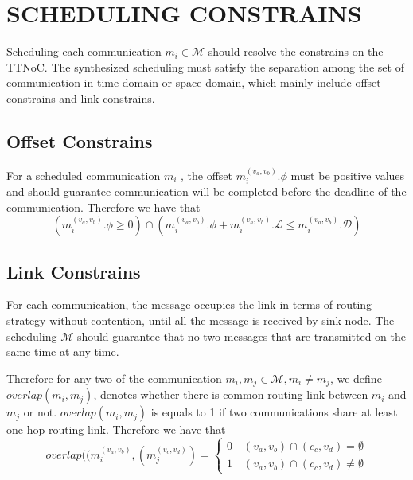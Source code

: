 \documentclass[jornal]{IEEEtran}
\begin{document}
\section{SCHEDULING CONSTRAINS\label{s:constrain}}

Scheduling each communication $m_{i}\in\mathcal{M}$ should resolve the constrains on the TTNoC. The synthesized scheduling must satisfy the separation among the set of communication in time domain or space domain, which mainly include offset constrains and link constrains.

\subsection{Offset Constrains}

For a scheduled communication $m_{i}$ , the offset $m_{i}^{(v_{a},v_{b})}.\phi$  must be positive values and should guarantee communication will be completed before the deadline of the communication. Therefore we have that
\begin{equation}
	(m_{i}^{(v_{a},v_{b})}.\phi
	\geq 0)
	\cap
	(m_{i}^{(v_{a},v_{b})}.\phi + m_{i}^{(v_{a},v_{b})}.\mathcal{L} \leq m_{i}^{(v_{a},v_{b})}.\mathcal{D})
\end{equation}

\subsection{Link Constrains}

For each communication, the message occupies the link in terms of routing strategy without contention, until all the message is received by sink node. The scheduling $\mathcal{M}$ should guarantee that no two messages that are transmitted on the same time at any time.

Therefore for any two of the communication $m_{i},m_{j}\in\mathcal{M}, m_{i}\neq m_{j}$, we define $ overlap(m_{i},m_{j}) $, denotes whether there is common routing link between $m_{i}$ and $m_{j}$ or not. $ overlap(m_{i},m_{j}) $ is equals to 1 if two communications share at least one hop routing link. Therefore we have that
\begin{equation}
overlap((m_{i}^{(v_{a},v_{b})},(m_{j}^{(v_{c},v_{d})})= 
	\begin{cases}
	0 \quad (v_{a},v_{b}) \cap (c_{c},v_{d}) = \emptyset\\
	1 \quad (v_{a},v_{b}) \cap (c_{c},v_{d}) \neq \emptyset
\end{cases}
\end{equation}
\end{document}
